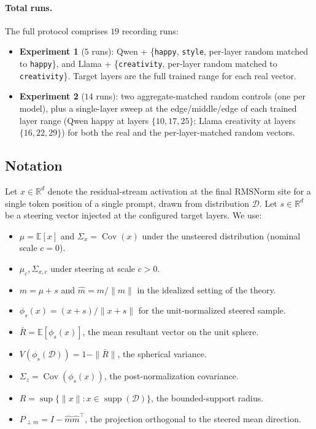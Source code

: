 \paragraph{Total runs.} The full protocol comprises $19$ recording runs:
\begin{itemize}
  \item \textbf{Experiment 1} ($5$ runs): Qwen + \{\texttt{happy}, \texttt{style}, per-layer random matched to \texttt{happy}\}, and Llama + \{\texttt{creativity}, per-layer random matched to \texttt{creativity}\}. Target layers are the full trained range for each real vector.
  \item \textbf{Experiment 2} ($14$ runs): two aggregate-matched random controls (one per model), plus a single-layer sweep at the edge/middle/edge of each trained layer range (Qwen happy at layers $\{10, 17, 25\}$; Llama creativity at layers $\{16, 22, 29\}$) for both the real and the per-layer-matched random vectors.
\end{itemize}

\subsection{Notation}
\label{sec:empirical-notation}

Let $x \in \mathbb{R}^d$ denote the residual-stream activation at the final RMSNorm site for a single token position of a single prompt, drawn from distribution $\mathcal{D}$. Let $s \in \mathbb{R}^d$ be a steering vector injected at the configured target layers. We use:
\begin{itemize}
  \item $\mu = \mathbb{E}[x]$ and $\Sigma_x = \operatorname{Cov}(x)$ under the unsteered distribution (nominal scale $c=0$).
  \item $\mu_c, \Sigma_{x,c}$ under steering at scale $c > 0$.
  \item $m = \mu + s$ and $\hat{m} = m/\|m\|$ in the idealized setting of the theory.
  \item $\phi_s(x) = (x+s)/\|x+s\|$ for the unit-normalized steered sample.
  \item $\bar{R} = \mathbb{E}[\phi_s(x)]$, the mean resultant vector on the unit sphere.
  \item $V(\phi_s(\mathcal{D})) = 1 - \|\bar{R}\|$, the spherical variance.
  \item $\Sigma_z = \operatorname{Cov}(\phi_s(x))$, the post-normalization covariance.
  \item $R = \sup\{\|x\| : x \in \operatorname{supp}(\mathcal{D})\}$, the bounded-support radius.
  \item $P_{\perp m} = I - \hat{m}\hat{m}^\top$, the projection orthogonal to the steered mean direction.
\end{itemize}

